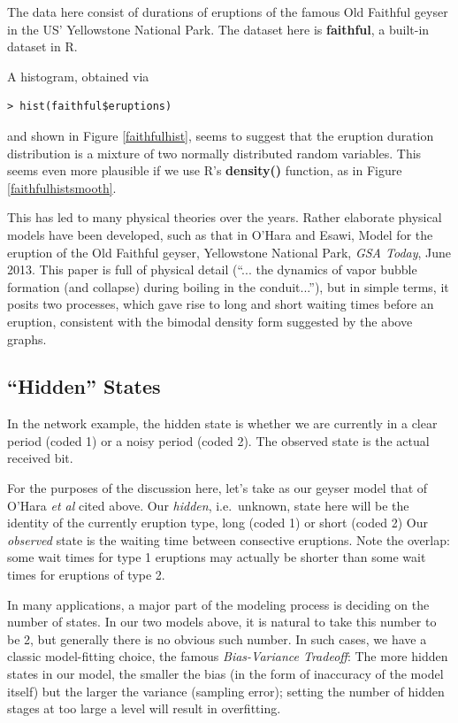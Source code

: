 \documentclass[11pt]{article}
\begin{document}
The data here consist of durations of eruptions of the famous
Old Faithful geyser in the US' Yellowstone National Park.  The dataset
here is \textbf{faithful}, a built-in dataset in R.

A histogram, obtained via 

\begin{lstlisting}
> hist(faithful$eruptions)
\end{lstlisting}

and shown in Figure \ref{faithfulhist}, seems to suggest that the
eruption duration distribution is a mixture of two normally distributed random
variables.  This seems even more plausible if we use R's 
\textbf{density()} function, as in Figure \ref{faithfulhistsmooth}.

This has led to many physical theories over the years.  Rather elaborate
physical models have been developed, such as that in O'Hara and Esawi,
Model for the eruption of the Old Faithful geyser, Yellowstone National
Park, \textit{GSA Today}, June 2013.  This paper is full of physical
detail (``... the dynamics of vapor bubble formation (and collapse)
during boiling in the conduit...''), but in simple terms, it posits two
processes, which gave rise to long and short waiting times before an
eruption, consistent with the bimodal density form suggested by the
above graphs.

\subsection{``Hidden'' States}

In the network example, the hidden state is whether we are currently in
a clear period (coded 1) or a noisy period (coded 2).  The observed
state is the actual received bit.

For the purposes of the discussion here, let's take as our geyser model
that of O'Hara \textit{et al} cited above.  Our \textit{hidden}, i.e.\
unknown, state here will be the identity of the currently eruption type,
long (coded 1) or short (coded 2) Our \textit{observed} state is the
waiting time between consective eruptions.  Note the overlap: some wait
times for type 1 eruptions may actually be shorter than some wait times
for eruptions of type 2.

In many applications, a major part of the modeling process is deciding
on the number of states.  In our two models above, it is natural to take
this number to be 2, but generally there is no obvious such number.  In
such cases, we have a classic model-fitting choice, the famous
\textit{Bias-Variance Tradeoff}:  The more hidden states in our model,
the smaller the bias (in the form of inaccuracy of the model itself) but
the larger the variance (sampling error); setting the number of hidden
stages at too large a level will result in overfitting.
\end{document}
